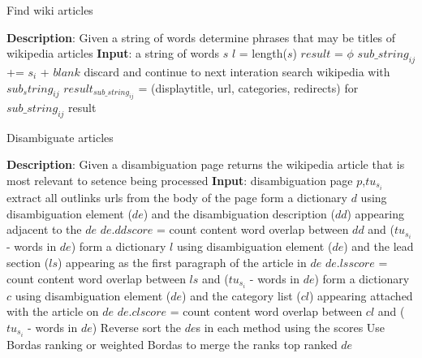 \documentclass[11pt]{article}
\begin{document}
\begin{algorithm}
\small
\caption{Find wiki articles}
\label{alg:findwikiarticles}
\begin{algorithmic}
\STATE \textbf{Description}: Given a string of words determine phrases
that may be titles of wikipedia articles
\STATE \textbf{Input}: a string of words $s$
\STATE $l$ = length($s$)
\STATE $result$ = $\phi$
               \STATE $sub\_string_{ij}$ += $s_i$ + $blank$
       \ENDFOR
               \STATE discard and continue to next interation
       \ELSE
               \STATE search wikipedia with $sub_string_{ij}$
               \STATE $result_{sub\_string_{ij}}$ = (displaytitle, url, categories,
redirects) for $sub\_string_{ij}$
       \ENDIF
\ENDFOR
\RETURN result
\end{algorithmic}
\end{algorithm}

\pagebreak

\begin{algorithm}
\small
\caption{Disambiguate articles}
\label{alg:disambiguate}
\begin{algorithmic}
\STATE \textbf{Description}: Given a disambiguation page returns the
wikipedia article that is most relevant to setence being processed
\STATE \textbf{Input}: disambiguation page $p$,$tu_{s_{i}}$
\STATE extract all outlinks urls from the body of the page
\STATE form a dictionary $d$ using disambiguation element ($de$) and
the disambiguation description ($dd$) appearing adjacent to the $de$
       \STATE $de.ddscore$ = count content word overlap between $dd$ and
($tu_{s_{i}}$ - words in  $de$)
\ENDFOR
\STATE form a dictionary $l$ using disambiguation element ($de$) and
the lead section ($ls$) appearing as the first paragraph of the
article in $de$
       \STATE $de.lsscore$ = count content word overlap between $ls$ and
($tu_{s_{i}}$ - words in  $de$)
\ENDFOR
\STATE form a dictionary $c$ using disambiguation element ($de$) and
the category list ($cl$) appearing attached with the article on $de$
               \STATE $de.clscore$ = count content word overlap between $cl$ and
($tu_{s_{i}}$ - words in  $de$)
       \ENDFOR
\ENDFOR
\STATE Reverse sort the $de$s in each method using the scores
\STATE Use Bordas ranking or weighted Bordas to merge the ranks
\RETURN top ranked $de$
\end{algorithmic}
\end{algorithm}
\end{document}

